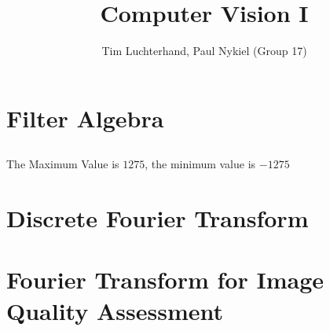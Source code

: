 \documentclass[DIN, pagenumber=false, fontsize=11pt, parskip=half]{scrartcl}
\title{Computer Vision I}
\author{Tim Luchterhand, Paul Nykiel (Group 17)}
\begin{document}
    \maketitle
    \section{Filter Algebra}
    \subsection{}
    The Maximum Value is $1275$, the minimum value is $-1275$  

    \section{Discrete Fourier Transform}

    \section{Fourier Transform for Image Quality Assessment}
\end{document}
